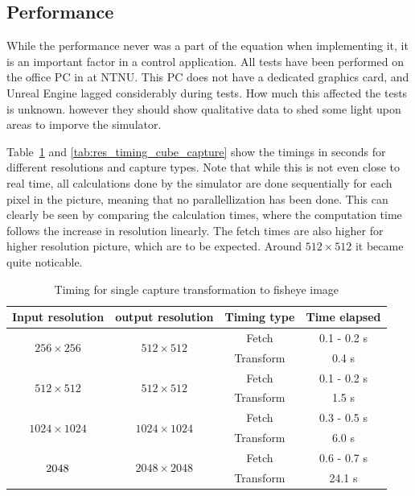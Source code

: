 \subsection{Performance} \label{sec:res_performance}

While the performance never was a part of the equation when implementing it, it is an important factor in a control application. All tests have been performed on the office PC in at NTNU. This PC does not have a dedicated graphics card, and Unreal Engine lagged considerably during tests. How much this affected the tests is unknown. however they should show qualitative data to shed some light upon areas to imporve the simulator.

Table~\ref{tab:res_timing_single} and \ref{tab:res_timing_cube_capture} show the timings in seconds for different resolutions and capture types. Note that while this is not even close to real time, all calculations done by the simulator are done sequentially for each pixel in the picture, meaning that no parallellization has been done. This can clearly be seen by comparing the calculation times, where the computation time follows the increase in resolution linearly. The fetch times are also higher for higher resolution picture, which are to be expected. Around $512\times 512$ it became quite noticable. 

\begin{table}[!htb]
    \centering
    \begin{tabular}{|c|c|c|c|} \hline
        \textbf{Input resolution} & \textbf{output resolution} & \textbf{Timing type} & \textbf{Time elapsed} \\ \hline \hline
        \multirow{2}{*}{$256 \times 256$} & \multirow{2}{*}{$512 \times 512$} & Fetch & 0.1 - 0.2 s \\ \cline{3-4}
         & & Transform & 0.4 s \\ \hline
        \multirow{2}{*}{$512 \times 512$} & \multirow{2}{*}{$512 \times 512$} & Fetch & 0.1 - 0.2 s\\ \cline{3-4}
         & & Transform & 1.5 s \\ \hline
        \multirow{2}{*}{$1024 \times 1024$} & \multirow{2}{*}{$1024 \times 1024$} & Fetch &  0.3 - 0.5 s \\ \cline{3-4}
         & & Transform & 6.0 s \\ \hline
        \multirow{2}{*}{$2048 \time 2048$} & \multirow{2}{*}{$2048 \times 2048$} & Fetch & 0.6 - 0.7 s\\ \cline{3-4}
         & & Transform & 24.1 s\\ \hline
    \end{tabular}
    \caption{Timing for single capture transformation to fisheye image}
    \label{tab:res_timing_single}
\end{table}

